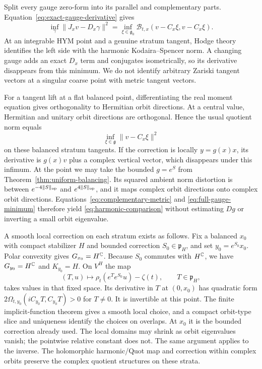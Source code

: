 Split every gauge zero-form into its parallel and complementary
parts. Equation~\eqref{eq:exact-gauge-derivative} gives
\begin{equation}\label{eq:full-gauge-minimum}
 \inf_\gamma\|J_xv-D_x\gamma\|^2
 =\inf_{\xi\in\mathfrak g_0}
       \mathcal B_{t,x}(v-C_x\xi,v-C_x\xi).
\end{equation}
At an integrable HYM point and a genuine stratum tangent,
Hodge theory identifies the left side with the harmonic
Kodaira--Spencer norm. A changing gauge adds an exact $D_x$ term
and conjugates isometrically, so its derivative disappears from
this minimum. We do not identify arbitrary Zariski tangent vectors
at a singular coarse point with metric tangent vectors.

For a tangent lift at a flat balanced point, differentiating the
real moment equation gives orthogonality to Hermitian orbit
directions. At a central value, Hermitian and unitary orbit
directions are orthogonal. Hence the usual quotient norm equals
\[
 \inf_{\xi\in\mathfrak g}\|v-C_x\xi\|^2
\]
on these balanced stratum tangents.
If the correction is locally $y=g(x)x$, its derivative is
$g(x)v$ plus a complex vertical vector, which disappears under
this infimum. At the point we may take the bounded $g=e^S$
from Theorem~\ref{thm:uniform-balancing}. Its squared ambient
norm distortion is between $e^{-4\|S\|_{\rm op}}$ and
$e^{4\|S\|_{\rm op}}$, and it maps complex orbit directions onto
complex orbit directions. Equations~\eqref{eq:complementary-metric}
and \eqref{eq:full-gauge-minimum} therefore yield
\eqref{eq:harmonic-comparison} without estimating $Dg$ or
inverting a small orbit eigenvalue.

A smooth local correction on each stratum exists as follows.
Fix a balanced $x_0$ with compact stabilizer $H$ and bounded
correction $S_0\in\mathfrak p_H$, and set $y_0=e^{S_0}x_0$.
Polar convexity gives $G_{x_0}=H^\mathbb C$.
Because $S_0$ commutes with $H^\mathbb C$, we have
$G_{y_0}=H^\mathbb C$ and $K_{y_0}=H$.
On $V^H$ the map
\[
 (T,u)\longmapsto\rho_t(e^Te^{S_0}u)-\zeta(t),
 \qquad T\in\mathfrak p_H,
\]
takes values in that fixed space. Its derivative in $T$ at
$(0,x_0)$ has quadratic form
$2\Omega_{t,y_0}(iC_{y_0}T,C_{y_0}T)>0$ for $T\ne0$.
It is invertible at this point. The finite implicit-function
theorem gives a smooth local choice, and a compact orbit-type
slice and uniqueness identify the choices on overlaps.
At $x_0$ it is the bounded correction already used.
The local domains may shrink as orbit eigenvalues vanish; the
pointwise relative constant does not. The same argument applies
to the inverse. The holomorphic harmonic/Quot map and correction
within complex orbits preserve the complex quotient structures
on these strata.

